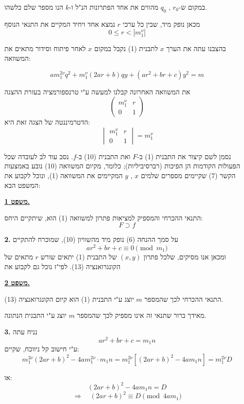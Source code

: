 \noindent במקום ש-$r_0$ , $q_0$ מהווים את אחד הפתרונות הנ"ל ו-$k$ הנו מספר שלם כלשהו.

\noindent מכאן נופק מיד, שבין כל ערכי $r$ נמצא אחד ויחיד המקיים את התנאי הנוסף
\[ 0 \leq r < |m_1^{\nu}| \tag{9} \]

\noindent בהצבנו עתה את הערך $x$ לתבנית (1) נקבל במקום $x$ לאחר פיתוח וסידור מתאים את המשוואה:

\[ am_1^{2\nu}q^2 + m_1^{\nu}(2ar+b)qy + (ar^2+br+c)y^2 = m \tag{10} \]

\noindent את המשוואה האחרונה קבלנו למעשה ע"י טרנספורמציה בעזרת ההצגה
\[ \begin{pmatrix} m_1^{\nu} & r \\ 0 & 1 \end{pmatrix} \tag{11} \]
\noindent הדטרמיננטה של הצגה זאת היא:
\[ \begin{vmatrix} m_1^{\nu} & r \\ 0 & 1 \end{vmatrix} = m_1^{\nu} \tag{12} \]

\noindent נסמן לשם קיצור את התבנית (1) ב-$F$ ואת התבנית (10) ב-$f$. נסב עוד לב לעובדה שכל הפעולות הקודמות הן הפיכות (רברסיביליות); כלומר, מקיום המשוואה (10) נובע באמצעות הקשר (7) שקיימים מספרים שלמים $x$ , $y$ המקיימים את המשוואה (1), ונוכל לקבוע את המשפט הבא:

\bigskip
\noindent\textbf{\underline{משפט 1.}}

\noindent התנאי ההכרחי והמספיק למציאות פתרון למשוואה (1) הוא, שיתקיים היחס:
\[ F \supset f \]

\bigskip
\noindent\textbf{2.} על סמך ההנחה (6) נופק מיד מהשוויון (10), שמוכרח להתקיים
\[ ar^2 + br + c \equiv 0 \pmod{m_1} \tag{13} \]
\noindent ומכאן אנו מסיקים, שלכל פתרון $(x,y)$ של התבנית (1) יתאים שורש $r$ מתאים של הקונגרואנציה (13). לפי"ז נוכל גם לקבוע את

\bigskip
\noindent\textbf{\underline{משפט 2.}}

\noindent התנאי ההכרחי לכך שהמספר $m$ יוצג ע"י התבנית (1) הוא קיום הקונגרואנציה (13).

\medskip
\noindent מאידך ברור שתנאי זה אינו מספיק לכך שהמספר $m$ יוצג ע"י התבנית הנתונה.

\bigskip
\noindent\textbf{3.} נניח עתה
\[ ar^2 + br + c = m_1 n \tag{14} \]
\noindent ע"י חישוב קל ניווכח, שקיים:
\[ m_1^{2\nu}(2ar+b)^2 - 4am_1^{2\nu}\cdot m_1n = m_1^{2\nu}\left[(2ar+b)^2 - 4am_1n\right] = m_1^{2\nu}D \]

\noindent או:
\[ (2ar+b)^2 - 4am_1n = D \tag{15} \]
\[ \Rightarrow \quad (2ar+b)^2 \equiv D \pmod{4am_1} \]

